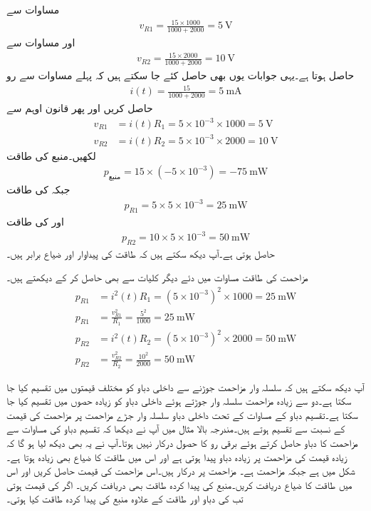 مساوات  سے
\begin{align*}
v_{R1}=\frac{15 \times 1000}{1000+2000}=\SI{5}{\volt} 
\end{align*}
اور مساوات  سے
\begin{align*}
v_{R2}=\frac{15 \times 2000}{1000+2000}=\SI{10}{\volt} 
\end{align*}
حاصل ہوتا ہے۔یہی جوابات یوں بھی حاصل کئے جا سکتے ہیں کہ پہلے مساوات  سے رو
\begin{align*}
i(t)=\frac{15}{1000+2000}=\SI{5}{\milli\ampere}
\end{align*}
حاصل کریں اور پھر قانون اوہم سے
\begin{align*}
v_{R1}&=i(t) R_1 =5 \times 10^{-3} \times 1000=\SI{5}{\volt}\\
v_{R2}&=i(t) R_2 =5 \times 10^{-3} \times 2000=\SI{10}{\volt}
\end{align*}
لکھیں۔منبع کی طاقت
\begin{align*}
p_{\text{منبع}}=15 \times (-5\times 10^{-3})=\SI{-75}{\milli\watt}
\end{align*}
جبکہ  کی طاقت
\begin{align*}
p_{R1}=5\times 5\times 10^{-3}= \SI{25}{\milli\watt}
\end{align*}
اور  کی طاقت
\begin{align*}
p_{R2}=10\times 5\times 10^{-3}= \SI{50}{\milli\watt}
\end{align*}
حاصل ہوتی ہے۔آپ دیکھ سکتے ہیں کہ طاقت کی پیداوار اور ضیاع برابر ہیں۔

مزاحمت کی طاقت مساوات   میں دئے دیگر کلیات سے بھی حاصل کر کے دیکھتے ہیں۔
\begin{align*}
p_{R1}&=i^2(t) R_1=(5\times 10^{-3})^2 \times 1000=\SI{25}{\milli\watt}\\
p_{R1}&=\frac{v^2_{R1}}{R_1}=\frac{5^2}{1000}=\SI{25}{\milli\watt}\\
p_{R2}&=i^2(t) R_2=(5\times 10^{-3})^2 \times 2000=\SI{50}{\milli\watt}\\
p_{R2}&=\frac{v^2_{R2}}{R_2}=\frac{10^2}{2000}=\SI{50}{\milli\watt}
\end{align*}

آپ دیکھ سکتے ہیں کہ سلسلہ وار مزاحمت جوڑنے سے داخلی دباو کو مختلف قیمتوں میں تقسیم کیا جا سکتا ہے۔دو سے زیادہ مزاحمت سلسلہ وار جوڑتے ہوئے داخلی دباو کو زیادہ حصوں میں تقسیم کیا جا سکتا ہے۔تقسیم دباو کے مساوات کے تحت داخلی دباو سلسلہ وار جڑے مزاحمت پر مزاحمت کی قیمت کے نسبت سے تقسیم ہوتے ہیں۔مندرجہ بالا مثال میں آپ نے دیکھا کہ تقسیم دباو کی مساوات سے مزاحمت کا دباو حاصل کرتے ہوئے  برقی رو  کا حصول درکار نہیں ہوتا۔آپ نے یہ بھی دیکھ لیا ہو گا کہ زیادہ قیمت کی مزاحمت پر زیادہ دباو پیدا ہوتی ہے اور اس میں طاقت کا ضیاع بھی زیادہ ہوتا ہے۔
شکل  میں  ہے جبکہ مزاحمت  ہے۔ مزاحمت  پر  درکار ہیں۔اس مزاحمت کی قیمت حاصل کریں اور اس میں طاقت کا ضیاع دریافت کریں۔منبع کی پیدا کردہ طاقت بھی دریافت کریں۔ اگر  کی قیمت  ہوتی تب  کی دباو اور  طاقت کے علاوہ منبع کی پیدا کردہ طاقت کیا ہوتی۔

